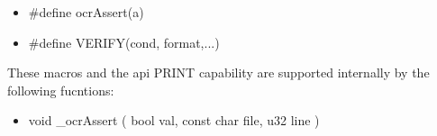 \begin{itemize}

\item \#define ocrAssert(a)

\item  \#define VERIFY(cond, format,...)

\end{itemize}

These macros and the api PRINT capability are supported internally by the following fucntions:

\begin{itemize}

\item void \_ocrAssert ( bool val, const char  file, u32 line )

\end{itemize}

